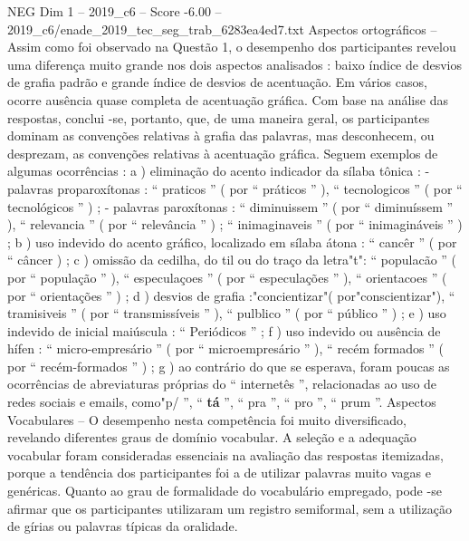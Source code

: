\begin{textsample}{NEG Dim 1 – 2019\_c6 – Score -6.00 – 2019\_c6/enade\_2019\_tec\_seg\_trab\_6283ea4ed7.txt}
Aspectos ortográficos – Assim como foi observado na Questão 1, o desempenho dos participantes revelou uma diferença muito grande nos dois aspectos analisados : baixo índice de desvios de grafia padrão e grande índice de desvios de acentuação.
Em vários casos, ocorre ausência quase completa de acentuação gráfica.
Com base na análise das respostas, conclui -se, portanto, que, de uma maneira geral, os participantes dominam as convenções relativas à grafia das palavras, mas desconhecem, ou desprezam, as convenções relativas à acentuação gráfica.
Seguem exemplos de algumas ocorrências : a ) eliminação do acento indicador da sílaba tônica : - palavras proparoxítonas : “ praticos ” ( por “ práticos ” ), “ tecnologicos ” ( por “ tecnológicos ” ) ; - palavras paroxítonas : “ diminuissem ” ( por “ diminuíssem ” ), “ relevancia ” ( por “ relevância ” ) ; “ inimaginaveis ” ( por “ inimagináveis ” ) ; b ) uso indevido do acento gráfico, localizado em sílaba átona : “ cancêr ” ( por “ câncer ) ; c ) omissão da cedilha, do til ou do traço da letra"t": “ populacão ” ( por “ população ” ), “ especulaçoes ” ( por “ especulações ” ), “ orientacoes ” ( por “ orientações ” ) ; d ) desvios de grafia :"concientizar"( por"conscientizar"), “ tramisiveis ” ( por “ transmissíveis ” ), “ pulblico ” ( por “ público ” ) ; e ) uso indevido de inicial maiúscula : “ Periódicos ” ; f ) uso indevido ou ausência de hífen : “ micro-empresário ” ( por “ microempresário ” ), “ recém formados ” ( por “ recém-formados ” ) ; g ) ao contrário do que se esperava, foram poucas as ocorrências de abreviaturas próprias do “ internetês ”, relacionadas ao uso de redes sociais e emails, como"p/ ”, “ \textbf{tá} ”, “ pra ”, “ pro ”, “ prum ”.
Aspectos Vocabulares – O desempenho nesta competência foi muito diversificado, revelando diferentes graus de domínio vocabular.
A seleção e a adequação vocabular foram consideradas essenciais na avaliação das respostas itemizadas, porque a tendência dos participantes foi a de utilizar palavras muito vagas e genéricas.
Quanto ao grau de formalidade do vocabulário empregado, pode -se afirmar que os participantes utilizaram um registro semiformal, sem a utilização de gírias ou palavras típicas da oralidade.

\end{textsample}
